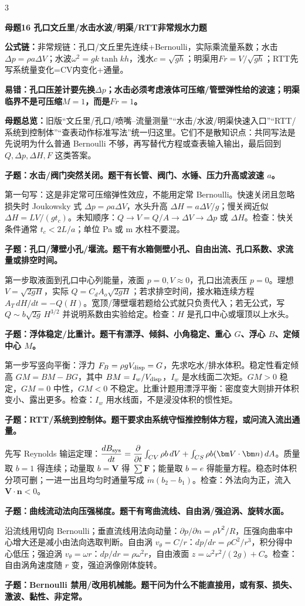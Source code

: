 \documentclass[a4paper]{article}
\newcommand{\mt}[1]{\vspace{0.12pt}\colorbox{M}{\parbox{\dimexpr\linewidth-2\fboxsep}{\color{white}\bfseries #1}}\par}
\newcommand{\qt}[1]{\vspace{0.04pt}\colorbox{Q}{\parbox{\dimexpr\linewidth-2\fboxsep}{\color{white}\bfseries #1}}\par}
\newcommand{\ans}[1]{\colorbox{G}{\parbox{\dimexpr\linewidth-2\fboxsep}{#1}}\par}
\newcommand{\warn}[1]{\colorbox{Y}{\parbox{\dimexpr\linewidth-2\fboxsep}{\color{E}\bfseries #1}}\par}
\newcommand{\form}[1]{{\color{M}\bfseries 公式链：}#1\par}
\newcommand{\mview}[1]{\ans{\textbf{母题总览：}#1}}
\begin{document}
\begin{multicols}{3}
\mt{母题16 孔口文丘里/水击水波/明渠/RTT非常规水力题}
\form{非常规链：孔口/文丘里先连续+Bernoulli，实际乘流量系数；水击$\Delta p=\rho a\Delta V$；水波$\omega^2=gk\tanh kh$，浅水$c=\sqrt{gh}$；明渠用$Fr=V/\sqrt{gh}$；RTT先写系统量变化=CV内变化+通量。}
\warn{易错：孔口压差计要先换$\Delta p$；水击必须考虑液体可压缩/管壁弹性给的波速；明渠临界不是可压缩$M=1$，而是$Fr=1$。}
\mview{旧版“文丘里/孔口/喷嘴--流量测量”“水击/水波/明渠快速入口”“RTT/系统到控制体”“查表动作标准写法”统一归这里。它们不是散知识点：共同写法是先说明为什么普通 Bernoulli 不够，再写替代方程或查表输入输出，最后回到 $Q,\Delta p,\Delta H,F$ 这类答案。}
\qt{子题：水击/阀门突然关闭。题干有长管、阀门、水锤、压力升高或波速 $a$。}
\ans{第一句写：这是非定常可压缩弹性效应，不能用定常 Bernoulli。快速关闭且忽略损失时 Joukowsky 式 $\Delta p=\rho a\Delta V$，水头升高 $\Delta H=a\Delta V/g$；慢关阀近似 $\Delta H=LV/(gt_c)$。未知顺序：$Q\to V=Q/A\to\Delta V\to\Delta p$ 或 $\Delta H$。检查：快关条件通常 $t_c<2L/a$；单位 Pa 或 m 水柱不要混。}
\qt{子题：孔口/薄壁小孔/堰流。题干有水箱侧壁小孔、自由出流、孔口系数、求流量或排空时间。}
\ans{第一步取液面到孔口中心列能量，液面 $p=0,V\approx0$，孔口出流表压 $p=0$。理想 $V=\sqrt{2gH}$，实际 $Q=C_dA_o\sqrt{2gH}$；若求排空时间，接水箱连续方程 $A_T\,dH/dt=-Q(H)$。宽顶/薄壁堰若题给公式就只负责代入；若无公式，写 $Q\sim b\sqrt{2g}\,H^{3/2}$ 并说明系数由实验给定。检查：$H$ 是孔口中心或堰顶以上水头。}
\qt{子题：浮体稳定/比重计。题干有漂浮、倾斜、小角稳定、重心 $G$、浮心 $B$、定倾中心 $M$。}
\ans{第一步写竖向平衡：浮力 $F_B=\rho gV_{\rm disp}=G$，先求吃水/排水体积。稳定性看定倾高 $GM=BM-BG$，其中 $BM=I_w/V_{\rm disp}$，$I_w$ 是水线面二次矩。$GM>0$ 稳定，$GM=0$ 中性，$GM<0$ 不稳定。比重计题用漂浮平衡：密度变大则排开体积变小、露出更多。检查：$I_w$ 用水线面，不是浸没体积的惯性矩。}
\qt{子题：RTT/系统到控制体。题干要求由系统守恒推控制体方程，或问流入流出通量。}
\ans{先写 Reynolds 输运定理：$\dfrac{dB_{\rm sys}}{dt}=\dfrac{\partial}{\partial t}\int_{CV}\rho b\,dV+\int_{CS}\rho b(\bm V\cdot\bm n)\,dA$。质量取 $b=1$ 得连续；动量取 $b=\bm V$ 得 $\sum\bm F$；能量取 $b=e$ 得能量方程。稳态时体积分项可删；一进一出且均匀时通量写成 $\dot m(b_2-b_1)$。检查：外法向为正，流入 $\bm V\cdot\bm n<0$。}
\qt{子题：曲线流动法向压强梯度。题干有弯曲流线、自由涡/强迫涡、旋转水面。}
\ans{沿流线用切向 Bernoulli；垂直流线用法向动量：$\partial p/\partial n=\rho V^2/R$，压强向曲率中心增大还是减小由法向选取判断。自由涡 $v_\theta=C/r$：$dp/dr=\rho C^2/r^3$，积分得中心低压；强迫涡 $v_\theta=\omega r$：$dp/dr=\rho\omega^2r$，自由液面 $z=\omega^2r^2/(2g)+C$。检查：自由涡角速度随 $r$ 变，强迫涡像刚体旋转。}
\qt{子题：Bernoulli 禁用/改用机械能。题干问为什么不能直接用，或有泵、损失、激波、黏性、非定常。}

\end{multicols}
\end{document}
